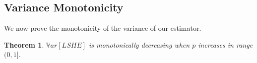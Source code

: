\documentclass{imsart}
\newtheorem{theorem}{Theorem}
\begin{document}
%

\vspace*{4em}
\subsection{Variance Monotonicity}
\label{mo}
We now prove the monotonicity of the variance of our estimator.
\begin{theorem}
	\label{thm}
	$\mathbb{V}ar[LSHE]$ is monotonically decreasing when $p$ increases in  range $(0,1]$.
\end{theorem}
\end{document}
